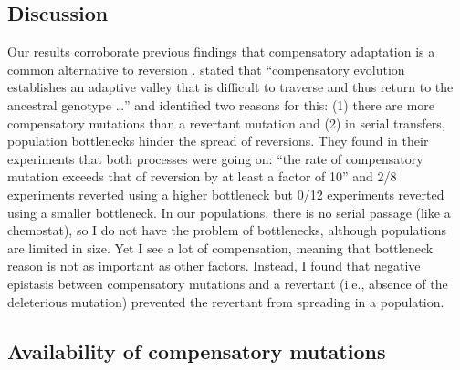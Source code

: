 \begin{doublespace}
\section{Discussion}

Our results corroborate previous findings that compensatory adaptation
is a common alternative to reversion \citep{bur99,moo00,lev00,mai02,est11}.
%
\citet{lev00} stated that ``compensatory evolution
establishes an adaptive valley that is difficult to traverse and thus return to
the ancestral genotype \ldots'' and identified two reasons for this:
(1) there are more compensatory mutations than a revertant mutation and
(2) in serial transfers, population bottlenecks hinder the spread of reversions.
%
They found in their experiments that both processes were going on: ``the rate
of compensatory mutation exceeds that of reversion by at least a factor of 10''
and 2/8 experiments reverted using a higher bottleneck but 0/12 experiments
reverted using a smaller bottleneck.
%
In our populations, there is no serial passage (like a chemostat), so I do
not have the problem of bottlenecks, although populations are limited in size.
%
Yet I see a lot of compensation, meaning that bottleneck
reason is not as important as other factors.
%
Instead, I found that negative epistasis between compensatory mutations
and a revertant (i.e., absence of the deleterious mutation)
prevented the revertant from spreading in a population.



\subsection{Availability of compensatory mutations}


\end{doublespace}
